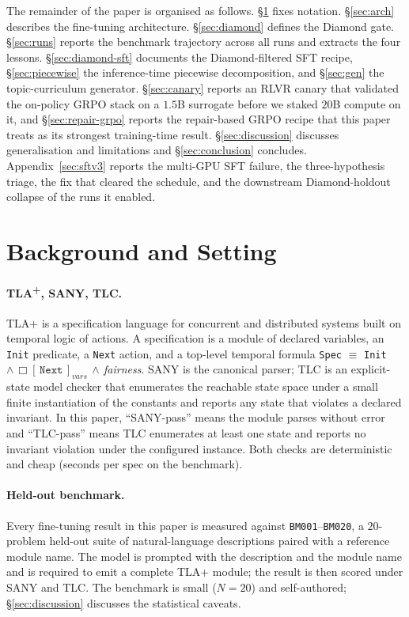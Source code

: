 \documentclass[11pt]{article}
\begin{document}
\noindent The remainder of the paper is organised as follows.
\S\ref{sec:bg} fixes notation. \S\ref{sec:arch} describes the
fine-tuning architecture. \S\ref{sec:diamond} defines the Diamond gate.
\S\ref{sec:runs} reports the benchmark trajectory across all runs and
extracts the four lessons. \S\ref{sec:diamond-sft} documents the
Diamond-filtered SFT recipe, \S\ref{sec:piecewise} the inference-time
piecewise decomposition, and \S\ref{sec:gen} the topic-curriculum
generator. \S\ref{sec:canary} reports an RLVR canary that validated the
on-policy GRPO stack on a $1.5$B surrogate before we staked $20$B
compute on it, and \S\ref{sec:repair-grpo} reports the repair-based
GRPO recipe that this paper treats as its strongest training-time
result. \S\ref{sec:discussion} discusses generalisation and
limitations and \S\ref{sec:conclusion} concludes.
Appendix~\ref{sec:sftv3} reports the multi-GPU SFT failure, the
three-hypothesis triage, the fix that cleared the schedule, and the
downstream Diamond-holdout collapse of the runs it enabled.

\section{Background and Setting}
\label{sec:bg}

\paragraph{TLA\textsuperscript{+}, SANY, TLC.} TLA+ is a specification
language for concurrent and distributed systems built on temporal logic
of actions. A specification is a module of declared variables, an
\texttt{Init} predicate, a \texttt{Next} action, and a top-level temporal
formula \texttt{Spec}\,$\,\equiv\,$\,\texttt{Init}\,$\wedge\,\Box[\,\texttt{Next}\,]_{vars}\,\wedge\,$\textit{fairness}.
SANY is the canonical parser; TLC is an explicit-state model checker that
enumerates the reachable state space under a small finite instantiation
of the constants and reports any state that violates a declared
invariant. In this paper, ``SANY-pass'' means the module parses without
error and ``TLC-pass'' means TLC enumerates at least one state and
reports no invariant violation under the configured instance. Both
checks are deterministic and cheap (seconds per spec on the benchmark).

\paragraph{Held-out benchmark.} Every fine-tuning result in this paper is
measured against \texttt{BM001}--\texttt{BM020}, a $20$-problem held-out
suite of natural-language descriptions paired with a reference module
name. The model is prompted with the description and the module name and
is required to emit a complete TLA+ module; the result is then scored
under SANY and TLC. The benchmark is small ($N=20$) and self-authored;
\S\ref{sec:discussion} discusses the statistical caveats.
\end{document}
